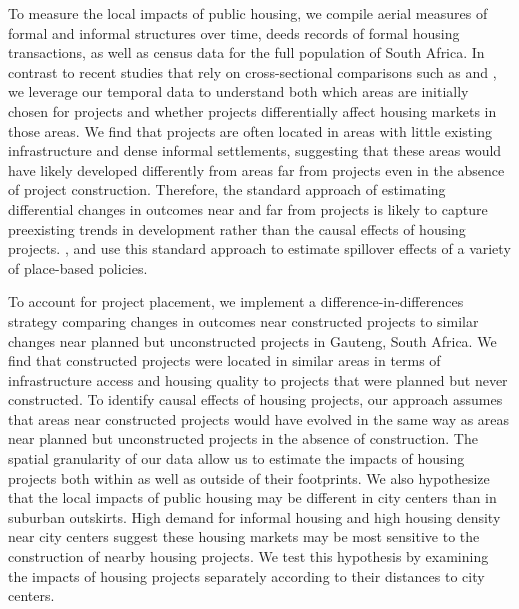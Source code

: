 \documentclass[12pt]{article}
\begin{document}

To measure the local impacts of public housing, we compile aerial measures of formal and informal structures over time, deeds records of formal housing transactions, as well as census data for the full population of South Africa.  In contrast to recent studies that rely on cross-sectional comparisons such as \cite{harari2018slum} and \cite{baruah2017planning}, we leverage our temporal data to understand both which areas are initially chosen for projects and whether projects differentially affect housing markets in those areas.  We find that projects are often located in areas with little existing infrastructure and dense informal settlements, suggesting that these areas would have likely developed differently from areas far from projects even in the absence of project construction.  Therefore, the standard approach of estimating differential changes in outcomes near and far from projects is likely to capture preexisting trends in development rather than the causal effects of housing projects.  \cite{rossi2010housing,hornbeck2017creative}, and \cite{diamond2016wants} use this standard approach to estimate spillover effects of a variety of place-based policies. %

To account for project placement, we implement a difference-in-differences strategy comparing changes in outcomes near constructed projects to similar changes near planned but unconstructed projects in Gauteng, South Africa.  We find that constructed projects were located in similar areas in terms of infrastructure access and housing quality to projects that were planned but never constructed.  To identify causal effects of housing projects, our approach assumes that areas near constructed projects would have evolved in the same way as areas near planned but unconstructed projects in the absence of construction.  The spatial granularity of our data allow us to estimate the impacts of housing projects both within as well as outside of their footprints.  We also hypothesize that the local impacts of public housing may be different in city centers than in suburban outskirts.  High demand for informal housing and high housing density near city centers suggest these housing markets may be most sensitive to the construction of nearby housing projects.  We test this hypothesis by examining the impacts of housing projects separately according to their distances to city centers.
\end{document}
